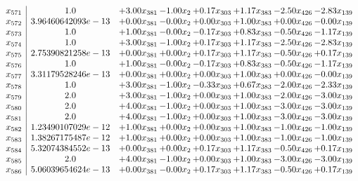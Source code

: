 \documentclass[8pt]{article}
\begin{document}
\[\begin{array}{c| c c@{\hskip 2pt} c@{\hskip 2pt} c@{\hskip 2pt} c@{\hskip 2pt} c@{\hskip 2pt} c@{\hskip 2pt} }
 x_{571}   &  1.0 & +  3.00 x_{381} & -1.00 x_{2} & +  0.17 x_{303} & +  1.17 x_{383} & -2.50 x_{426} & -2.83 x_{139}\\
 x_{572}   &  3.96460642093e-13 & +  0.00 x_{381} & -0.00 x_{2} & +  0.00 x_{303} & +  1.00 x_{383} & +  0.00 x_{426} & -0.00 x_{139}\\
 x_{573}   &  1.0 & +  1.00 x_{381} & -0.00 x_{2} & -0.17 x_{303} & +  0.83 x_{383} & -0.50 x_{426} & -1.17 x_{139}\\
 x_{574}   &  1.0 & +  3.00 x_{381} & -1.00 x_{2} & +  0.17 x_{303} & +  1.17 x_{383} & -2.50 x_{426} & -2.83 x_{139}\\
 x_{575}   &  2.75390821258e-13 & +  0.00 x_{381} & +  0.00 x_{2} & +  0.17 x_{303} & +  1.17 x_{383} & -0.50 x_{426} & +  0.17 x_{139}\\
 x_{576}   &  1.0 & +  1.00 x_{381} & -0.00 x_{2} & -0.17 x_{303} & +  0.83 x_{383} & -0.50 x_{426} & -1.17 x_{139}\\
 x_{577}   &  3.31179528246e-13 & +  0.00 x_{381} & +  0.00 x_{2} & +  0.00 x_{303} & +  1.00 x_{383} & +  0.00 x_{426} & -0.00 x_{139}\\
 x_{578}   &  1.0 & +  3.00 x_{381} & -1.00 x_{2} & -0.33 x_{303} & +  0.67 x_{383} & -2.00 x_{426} & -2.33 x_{139}\\
 x_{579}   &  2.0 & +  3.00 x_{381} & -1.00 x_{2} & +  0.00 x_{303} & +  1.00 x_{383} & -2.00 x_{426} & -3.00 x_{139}\\
 x_{580}   &  2.0 & +  4.00 x_{381} & -1.00 x_{2} & +  0.00 x_{303} & +  1.00 x_{383} & -3.00 x_{426} & -3.00 x_{139}\\
 x_{581}   &  2.0 & +  4.00 x_{381} & -1.00 x_{2} & +  0.00 x_{303} & +  1.00 x_{383} & -3.00 x_{426} & -3.00 x_{139}\\
 x_{582}   &  1.23490107029e-12 & +  1.00 x_{381} & +  0.00 x_{2} & +  0.00 x_{303} & +  1.00 x_{383} & -1.00 x_{426} & -1.00 x_{139}\\
 x_{583}   &  1.38267175487e-12 & +  1.00 x_{381} & +  0.00 x_{2} & +  0.00 x_{303} & +  1.00 x_{383} & -1.00 x_{426} & -1.00 x_{139}\\
 x_{584}   &  5.32074384552e-13 & +  0.00 x_{381} & +  0.00 x_{2} & +  0.17 x_{303} & +  1.17 x_{383} & -0.50 x_{426} & +  0.17 x_{139}\\
 x_{585}   &  2.0 & +  4.00 x_{381} & -1.00 x_{2} & +  0.00 x_{303} & +  1.00 x_{383} & -3.00 x_{426} & -3.00 x_{139}\\
 x_{586}   &  5.06039654624e-13 & +  0.00 x_{381} & -0.00 x_{2} & +  0.17 x_{303} & +  1.17 x_{383} & -0.50 x_{426} & +  0.17 x_{139}\\

\end{array}\]
\end{document}
